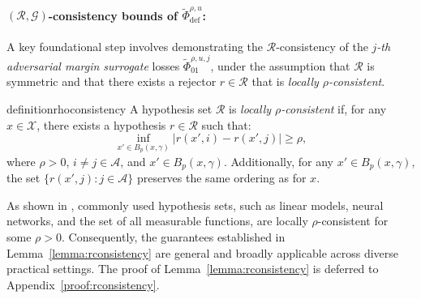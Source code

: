 \paragraph{\((\mathcal{R}, \mathcal{G})\)-consistency bounds of \(\widetilde{\Phi}^{\rho, u}_{\text{def}}\):}
A key foundational step involves demonstrating the \(\mathcal{R}\)-consistency of the \textit{\(j\)-th adversarial margin surrogate} losses \( \widetilde{\Phi}^{\rho,u,j}_{01} \), under the assumption that \( \mathcal{R} \) is symmetric and that there exists a rejector \( r \in \mathcal{R} \) that is \textit{locally \(\rho\)-consistent}.

\begin{restatable}{definition}{rhoconsistency}
    A hypothesis set \( \mathcal{R} \) is \textit{locally \(\rho\)-consistent} if, for any \( x \in \mathcal{X} \), there exists a hypothesis \( r \in \mathcal{R} \) such that:
    \begin{equation*}
        \inf_{x' \in B_p(x, \gamma)} |r(x', i) - r(x', j)| \geq \rho,
    \end{equation*}
    where \(\rho > 0\), \(i \neq j \in \mathcal{A}\), and \(x' \in B_p(x, \gamma)\). Additionally, for any \( x' \in B_p(x, \gamma) \), the set \(\{r(x', j) : j \in \mathcal{A}\}\) preserves the same ordering as for \( x \).
\end{restatable}

As shown in \citet{Awasthi_Mao_Mohri_Zhong_2022_multi, mao2023crossentropylossfunctionstheoretical, Grounded}, commonly used hypothesis sets, such as linear models, neural networks, and the set of all measurable functions, are locally \(\rho\)-consistent for some \(\rho > 0\). Consequently, the guarantees established in Lemma~\ref{lemma:rconsistency} are general and broadly applicable across diverse practical settings. The proof of Lemma~\ref{lemma:rconsistency} is deferred to Appendix~\ref{proof:rconsistency}.


